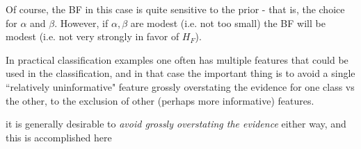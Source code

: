 \documentclass{article}[11pt]
\def\Hf{H_F}
\begin{document}
Of course, the BF in this case is quite sensitive to the prior - that is, the choice for $\alpha$ and $\beta$. 
However, if $\alpha,\beta$ are modest (i.e. not too small) the BF will be modest (i.e. not very strongly in favor of $\Hf$). 

In practical classification examples one often has multiple features that could be used in the classification, and in that case
the important thing is to avoid a single ``relatively uninformative" feature grossly overstating the evidence for one class vs the other,
to the exclusion of other (perhaps more informative) features.



it is generally desirable to {\it avoid grossly overstating the evidence} either way, and this is accomplished here 
\end{document}

